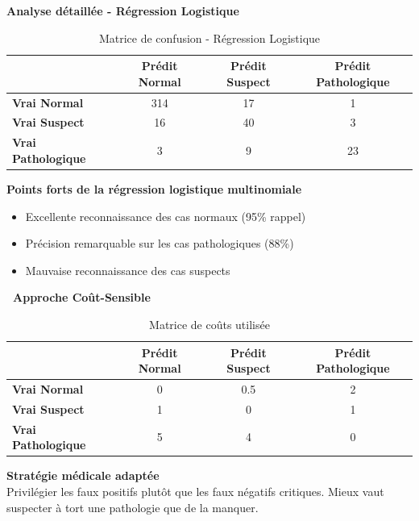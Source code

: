 \documentclass[a0,landscape]{a0poster}
\newcommand{\bigsection}[1]{
  \vspace{0.5cm}
  \begin{tcolorbox}[
    colback=primaryblue,
    coltext=white,
    arc=2mm,
    boxrule=0pt,
    left=10pt,
    right=10pt,
    top=5pt,
    bottom=5pt
  ]
    {\Large\bfseries #1\par}
  \end{tcolorbox}
  \vspace{0.3cm}
}
\newcommand{\checkitem}{\item[\textcolor{accentgreen}{\faCheck}]}
\newcommand{\alertitem}{\item[\textcolor{accentorange}{\faExclamationTriangle}]}
\begin{document}
\begin{multicols}{3}
\vspace{0.5cm}

\textbf{\color{primaryblue} Analyse détaillée - Régression Logistique}

\begin{table}[H]
\centering
\small
\caption{Matrice de confusion - Régression Logistique}
\begin{tabular}{@{}l c c c@{}}
\toprule
\textbf{} & \textbf{Prédit Normal} & \textbf{Prédit Suspect} & \textbf{Prédit Pathologique} \\
\midrule
\textbf{Vrai Normal} & 314 & 17 & 1 \\
\textbf{Vrai Suspect} & 16 & 40 & 3 \\
\textbf{Vrai Pathologique} & 3 & 9 & 23 \\
\bottomrule
\end{tabular}
\end{table}

\begin{infobox}
\textbf{Points forts de la régression logistique multinomiale}
\begin{itemize}
  \checkitem Excellente reconnaissance des cas normaux (95\% rappel)
  \checkitem Précision remarquable sur les cas pathologiques (88\%)
  \alertitem Mauvaise reconnaissance des cas suspects
\end{itemize}
\end{infobox}

\bigsection{\faBalanceScale\ Approche Coût-Sensible}

\begin{table}[H]
\centering
\small
\caption{Matrice de coûts utilisée}
\begin{tabular}{@{}l c c c@{}}
\toprule
\textbf{} & \textbf{Prédit Normal} & \textbf{Prédit Suspect} & \textbf{Prédit Pathologique} \\
\midrule
\textbf{Vrai Normal} & 0 & 0.5 & 2 \\
\textbf{Vrai Suspect} & 1 & 0 & 1 \\
\textbf{Vrai Pathologique} & 5 & 4 & 0 \\
\bottomrule
\end{tabular}
\end{table}

\begin{warningbox}
\textbf{Stratégie médicale adaptée}\\
Privilégier les faux positifs plutôt que les faux négatifs critiques. Mieux vaut suspecter à tort une pathologie que de la manquer.
\end{warningbox}


\end{multicols}
\end{document}
